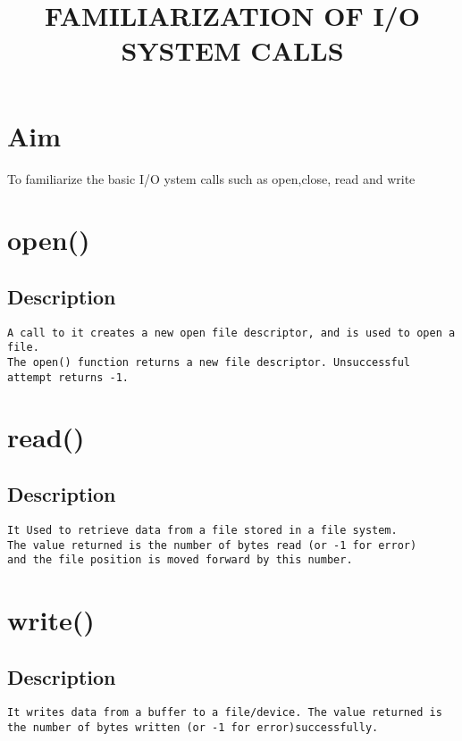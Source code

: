 \documentclass{article}
\title{\textbf {FAMILIARIZATION OF I/O SYSTEM CALLS}}
\date{\vspace{-5ex}}
\begin{document}
\maketitle
\thispagestyle{first}
\pagestyle{third}
\section*{\Large Aim}
To familiarize the basic I/O ystem calls such as open,close, read and write
\section{open()}

\subsection{Description}
\begin{Verbatim}[tabsize = 4]
A call to it creates a new open file descriptor, and is used to open a file. 
The open() function returns a new file descriptor. Unsuccessful attempt returns -1.
\end{Verbatim}
\section{read()}
\subsection{Description}
\begin{Verbatim}[tabsize = 4]
It Used to retrieve data from a file stored in a file system. 
The value returned is the number of bytes read (or -1 for error) 
and the file position is moved forward by this number.

\end{Verbatim}
\section{write()}
\subsection{Description}
\begin{Verbatim}[tabsize = 4]
It writes data from a buffer to a file/device. The value returned is 
the number of bytes written (or -1 for error)successfully.

\end{Verbatim}
\end{document}
